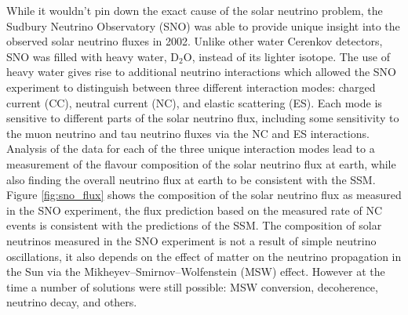 While it wouldn't pin down the exact cause of the solar neutrino problem, the
Sudbury Neutrino Observatory (SNO) was able to provide unique insight into the 
observed solar neutrino fluxes in 2002. Unlike other water Cerenkov detectors, 
SNO was filled with heavy water, \(\mbox{D}_2\mbox{O}\), instead of its 
lighter isotope. The use of heavy water gives rise to additional neutrino 
interactions which allowed the SNO experiment to distinguish between three 
different interaction modes: charged current (CC), neutral current (NC), and 
elastic scattering (ES). Each mode is sensitive to different parts of the 
solar neutrino flux, including some sensitivity to the muon neutrino and tau 
neutrino fluxes via the NC and ES interactions. Analysis of the data for each 
of the three unique interaction modes lead to a measurement of the flavour 
composition of the solar neutrino flux at earth, while also finding the 
overall neutrino flux at earth to be consistent with the SSM.  Figure 
\ref{fig:sno_flux} shows the composition of the solar neutrino flux as 
measured in the SNO experiment\cite{Ahmad2002}, the flux prediction based on 
the measured rate of NC events is consistent with the predictions of the SSM. 
The composition of solar neutrinos measured in the SNO experiment is not a 
result of simple neutrino oscillations, it also depends on the effect of matter 
on the neutrino propagation in the Sun via the Mikheyev–Smirnov–Wolfenstein 
(MSW) effect. However at the time a number of solutions were still possible: 
MSW conversion, decoherence, neutrino decay, and others\cite{Smirnov:2016xzf}. 

